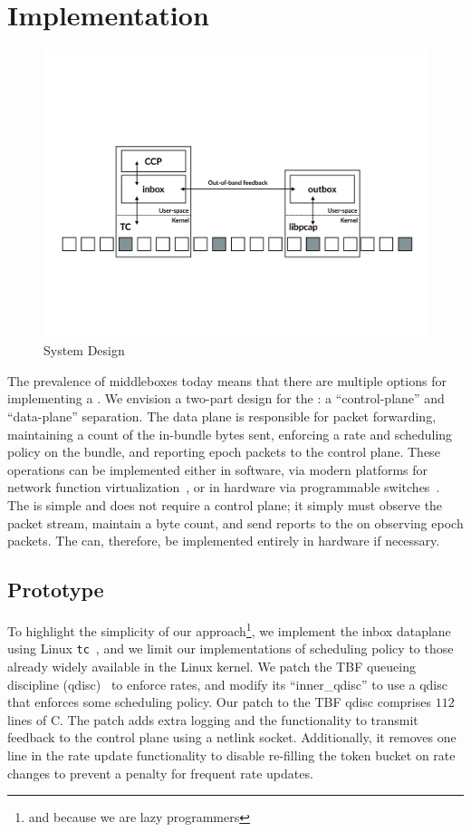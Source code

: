 \section{Implementation}\label{s:impl}
\begin{figure}
    \centering
    \includegraphics[width=2\columnwidth]{img/bundler-diagram}
    \caption{\name System Design}\label{fig:bundler}
\end{figure}

The prevalence of middleboxes today means that there are multiple options for implementing a \name.
We envision a two-part design for the \inbox: a ``control-plane'' and ``data-plane'' separation.
The data plane is responsible for packet forwarding, maintaining a count of the in-bundle bytes sent, enforcing a rate and scheduling policy on the bundle, and reporting epoch packets to the control plane.
These operations can be implemented either in software, via modern platforms for network function virtualization~\cite{bess, click, mos, netbricks}, or in hardware via programmable switches~\cite{p4}.
The \outbox is simple and does not require a control plane; it simply must observe the packet stream, maintain a byte count, and send reports to the \inbox on observing epoch packets.
The \outbox can, therefore, be implemented entirely in hardware if necessary.

\subsection{Prototype}\label{s:impl:prototype}
To highlight the simplicity of our approach\footnote{and because we are lazy programmers}, we implement the inbox dataplane using Linux \texttt{tc}~\cite{tc}, and we limit our implementations of scheduling policy to those already widely available in the Linux kernel.
We patch the TBF queueing discipline (qdisc)~\cite{tbf} to enforce rates, and modify its ``inner\_qdisc'' to use a qdisc that enforces some scheduling policy.
Our patch to the TBF qdisc comprises $112$ lines of C.
The patch adds extra logging and the functionality to transmit feedback to the control plane using a netlink socket. 
Additionally, it removes one line in the rate update functionality to disable re-filling the token bucket on rate changes to prevent a penalty for frequent rate updates.

